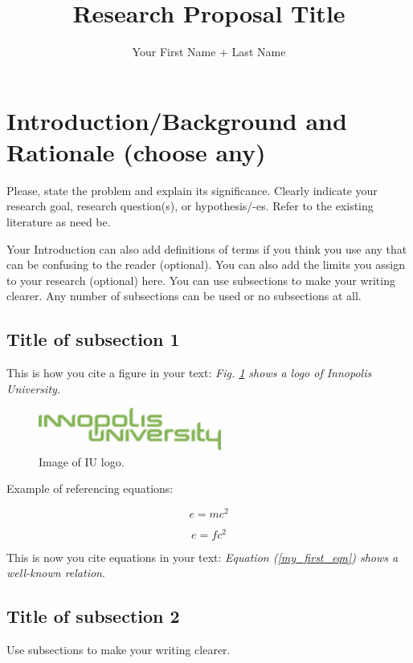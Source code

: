 \documentclass[oneside,final,12pt,a4paper]{extreport}
\title{Research Proposal Title}
\author{Your First Name + Last Name}
\affil{Innopolis University}
\begin{document}
\maketitle

\newpage

\section{Introduction/Background and Rationale (choose any)}
Please, state the problem and explain its significance. Clearly indicate your research goal, research question(s), or hypothesis/-es. Refer to the existing literature as need be. 

Your Introduction can also add definitions of terms if you think you use any that can be confusing to the reader (optional). You can also add the limits you assign to your research (optional) here. You can use subsections to make your writing clearer. Any number of subsections can be used or no subsections at all.
\subsection{Title of subsection 1}

This is how you cite a figure in your text: \textit{Fig. \ref{fig:inno} shows a logo of Innopolis University.}

\begin{figure}[htp]
    \centering
    \includegraphics[width=6cm]{figs/inno.png}
    \caption{Image of IU logo.}
    \label{fig:inno}
\end{figure}Example of referencing equations: 



\begin{equation}\label{my_first_eqn}
e=mc^2
\end{equation}

\begin{equation}\label{my_second_eqn}
e=fc^2
\end{equation}

This is now you cite equations in your text: \textit{Equation (\ref{my_first_eqn}) shows a well-known relation}.
\subsection{Title of subsection 2}
Use subsections to make your writing clearer.
\end{document}
